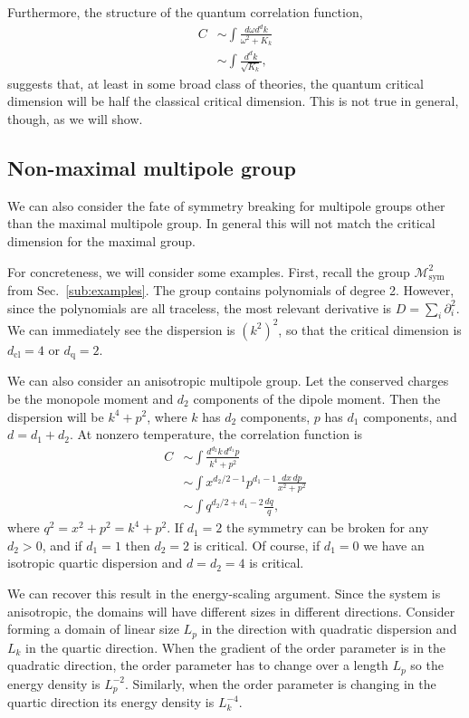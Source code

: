 \documentclass[pra,aps,twocolumn, amsfonts,amsmath,amssymb,nofootinbib,superscriptaddress]{revtex4-2}
\newcommand{\nn}{\nonumber\\}
\newcommand{\cl}{\text{cl}}
\newcommand{\q}{\text{q}}
\begin{document}
Furthermore, the structure of the quantum correlation function,
\begin{align}
C &\sim \int \frac{d\omega d^dk}{\omega^2 + K_k}\nn
&\sim \int \frac{d^dk}{\sqrt{K_k}},
\end{align}
suggests that, at least in some broad class of theories, the quantum critical dimension will be half the classical critical dimension. This is not true in general, though, as we will show.

\subsection{Non-maximal multipole group} \label{sub:nonmax}

We can also consider the fate of symmetry breaking for multipole groups other than the maximal multipole group. In general this will not match the critical dimension for the maximal group. 

For concreteness, we will consider some examples. First, recall the group $\mathcal{M}^2_\text{sym}$ from Sec.~\ref{sub:examples}. The group contains polynomials of degree 2. However, since the polynomials are all traceless, the most relevant derivative is $D = \sum_i \partial^2_i$.  We can immediately see the dispersion is $(k^2)^2$, so that the critical dimension is $d_\cl = 4$ or $d_\q = 2$.

We can also consider an anisotropic multipole group. 
Let the conserved charges be the monopole moment and $d_2$ components of the dipole moment. Then the dispersion will be $k^4 + p^2$, where $k$ has $d_2$ components, $p$ has $d_1$ components, and $d = d_1+d_2$. At nonzero temperature, the correlation function is
\begin{align}
C &\sim \int \frac{d^{d_2} k \, d^{d_1} p}{k^4 + p^2}\nn
&\sim \int x^{d_2/2 -1} p^{d_1-1} \frac{dx\, dp}{x^2 +p^2} \nn
&\sim \int q^{d_2/2 + d_1 - 2}\frac{dq}{q},
\end{align}
where $q^2 = x^2 + p^2 = k^4 + p^2$. 
If $d_1=2$ the symmetry can be broken for any $d_2>0$, and if $d_1=1$ then $d_2=2$  is critical. Of course, if $d_1=0$ we have an isotropic quartic dispersion and $d=d_2=4$ is critical. 

We can recover this result in  the energy-scaling argument. Since the system is anisotropic, the domains will have different sizes in different directions. Consider forming a domain of linear size $L_p$ in the  direction with quadratic dispersion and $L_k$ in the quartic direction. When the gradient of the order parameter is in the quadratic direction, the order parameter has to change over a length $L_p$ so the energy density is $L_p^{-2}$. Similarly, when the order parameter is changing in the quartic direction its energy density is $L_k^{-4}$. 
\end{document}
